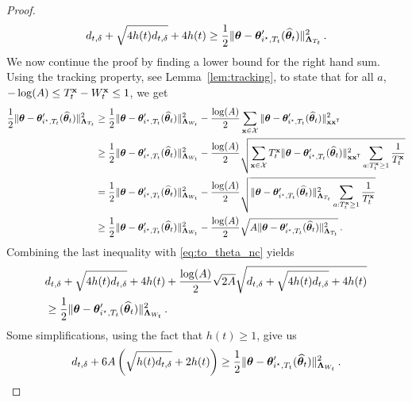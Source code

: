 \begin{proof}
\begin{equation}
\label{eq:to_theta_nc}
d_{t,\delta} + \sqrt{4 h(t) d_{t,\delta}} +4h(t) \geq \frac{1}{2} \Vert {\boldsymbol \theta} - {\boldsymbol \theta}'_{i^\star,T_t}(\widehat{{\boldsymbol \theta}}_t) \Vert_{{\boldsymbol \Lambda}_{T_t}}^2 \,.
\end{equation}
We now continue the proof by finding a lower bound for the right hand sum. Using the tracking property, see Lemma~\ref{lem:tracking}, to state that for all $a$, $- \log(A) \le T_t^{{\bf x}} - W_t^{{\bf x}}\le 1$, we get
\begin{align*}
\frac{1}{2} \Vert {\boldsymbol \theta} - {\boldsymbol \theta}'_{i^\star,T_t}(\widehat{{\boldsymbol \theta}}_t) \Vert_{{\boldsymbol \Lambda}_{T_t}}^2
&\ge \frac{1}{2} \Vert {\boldsymbol \theta} - {\boldsymbol \theta}'_{i^\star,T_t}(\widehat{{\boldsymbol \theta}}_t) \Vert_{{\boldsymbol \Lambda}_{W_t}}^2
	- \frac{\log(A)}{2} \sum_{{\bf x}\in\mathcal{X}} \Vert {\boldsymbol \theta} - {\boldsymbol \theta}'_{i^\star,T_t}(\widehat{{\boldsymbol \theta}}_t) \Vert_{{\bf x}{\bf x}^\mathsf{\scriptscriptstyle T}}^2
\\
&\ge \frac{1}{2} \Vert {\boldsymbol \theta} - {\boldsymbol \theta}'_{i^\star,T_t}(\widehat{{\boldsymbol \theta}}_t) \Vert_{{\boldsymbol \Lambda}_{W_t}}^2
	- \frac{\log(A)}{2} \sqrt{\sum_{{\bf x}\in\mathcal{X}} T_t^{{\bf x}}\Vert {\boldsymbol \theta} - {\boldsymbol \theta}'_{i^\star,T_t}(\widehat{{\boldsymbol \theta}}_t) \Vert_{{\bf x}{\bf x}^\mathsf{\scriptscriptstyle T}}^2\sum_{a:T_t^{\bf x}\ge 1} \frac{1}{T_t^{\bf x}}   }
\\
&=   \frac{1}{2} \Vert {\boldsymbol \theta} - {\boldsymbol \theta}'_{i^\star,T_t}(\widehat{{\boldsymbol \theta}}_t) \Vert_{{\boldsymbol \Lambda}_{W_t}}^2
	- \frac{\log(A)}{2} \sqrt{\Vert {\boldsymbol \theta} - {\boldsymbol \theta}'_{i^\star,T_t}(\widehat{{\boldsymbol \theta}}_t) \Vert_{{\boldsymbol \Lambda}_{T_t}}^2\sum_{a:T_t^{\bf x}\ge 1} \frac{1}{T_t^{\bf x}}   }
\\
&\ge \frac{1}{2} \Vert {\boldsymbol \theta} - {\boldsymbol \theta}'_{i^\star,T_t}(\widehat{{\boldsymbol \theta}}_t) \Vert_{{\boldsymbol \Lambda}_{W_t}}^2
	-\frac{\log(A)}{2} \sqrt{ A \Vert {\boldsymbol \theta} - {\boldsymbol \theta}'_{i^\star,T_t}(\widehat{{\boldsymbol \theta}}_t) \Vert_{{\boldsymbol \Lambda}_{T_t}}^2  }\,.
\end{align*}
Combining the last inequality with \eqref{eq:to_theta_nc} yields
\begin{align*}
    &d_{t,\delta} + \sqrt{4 h(t) d_{t,\delta}} +4h(t)+\frac{\log(A)}{2} \sqrt{2 A}\sqrt{d_{t,\delta} + \sqrt{4 h(t) d_{t,\delta}} +4h(t)}\\
    &\geq \frac{1}{2} \Vert {\boldsymbol \theta} - {\boldsymbol \theta}'_{i^\star,T_t}(\widehat{{\boldsymbol \theta}}_t) \Vert_{{\boldsymbol \Lambda}_{W_t}}^2\,.
\end{align*}
Some simplifications, using the fact that $h(t)\geq 1 $, give us
\begin{equation}
  \label{eq:to_tW_nc}
  d_{t,\delta}+6A\left( \sqrt{h(t)d_{t,\delta}}+2h(t)\right)
  \geq  \frac{1}{2} \Vert \btheta - \btheta'_{\istar,T_t}(\hat{\btheta}_t) \Vert_{\bLambda_{W_t}}^2\,.

\end{equation}
\end{proof}

